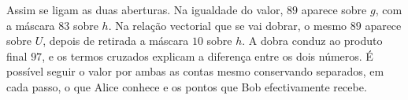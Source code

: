 Assim se ligam as duas aberturas. Na igualdade do valor, \(89\)
aparece sobre \(g\), com a máscara \(83\) sobre \(h\). Na relação
vectorial que se vai dobrar, o mesmo \(89\) aparece sobre \(U\),
depois de retirada a máscara \(10\) sobre \(h\). A dobra conduz
ao produto final \(97\), e os termos cruzados explicam a diferença
entre os dois números. É possível seguir o valor por ambas as
contas mesmo conservando separados, em cada passo, o que Alice
conhece e os pontos que Bob efectivamente recebe.
